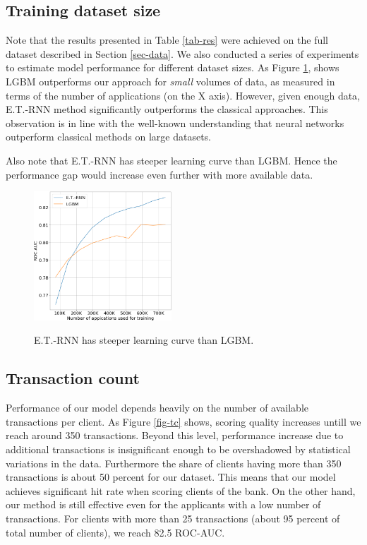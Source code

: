 \documentclass[sigconf]{acmart}
\begin{document}
\subsection{Training dataset size}

Note that the results presented in Table \ref{tab-res} were achieved on the full dataset described in Section \ref{sec-data}. We also conducted a series of experiments to estimate model performance for different dataset sizes.
As Figure \ref{fig-lc}, shows LGBM outperforms our approach for \textit{small} volumes of data, as measured in terms of the number of applications (on the X axis). However, given enough data, E.T.-RNN method significantly outperforms the classical approaches. This observation is in line with the well-known understanding that neural networks outperform classical methods on large datasets.

Also note that E.T.-RNN has steeper learning curve than LGBM. Hence the performance gap would increase even further with more available data.

\begin{figure}[ht]
  \caption{E.T.-RNN has steeper learning curve than LGBM.}
  \includegraphics[width=0.46\textwidth]{figures/learning-curve.png}
  \label{fig-lc}
\end{figure}

\subsection{Transaction count}

Performance of our model depends heavily on the number of available transactions per client. As Figure \ref{fig-tc} shows, scoring quality increases untill we reach around 350 transactions. Beyond this level, performance increase due to additional transactions is insignificant enough to be overshadowed by statistical variations in the data. Furthermore the share of clients having more than 350 transactions is about 50 percent for our dataset. This means that our model achieves significant hit rate when scoring clients of the bank. On the other hand, our method is still effective even for the applicants with a low number of transactions. For clients with more than 25 transactions (about 95 percent of total number of clients), we reach 82.5 ROC-AUC.
\end{document}

